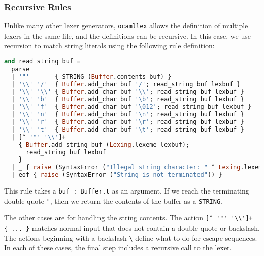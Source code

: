 \hypertarget{recursive-rules}{%
\subsubsection{Recursive Rules}\label{recursive-rules}}

Unlike many other lexer generators, \passthrough{\lstinline!ocamllex!}
allows the definition of multiple lexers in the same file, and the
definitions can be recursive. In this case, we use recursion to match
string literals using the following rule definition:

\begin{lstlisting}[language=Caml]
and read_string buf =
  parse
  | '"'       { STRING (Buffer.contents buf) }
  | '\\' '/'  { Buffer.add_char buf '/'; read_string buf lexbuf }
  | '\\' '\\' { Buffer.add_char buf '\\'; read_string buf lexbuf }
  | '\\' 'b'  { Buffer.add_char buf '\b'; read_string buf lexbuf }
  | '\\' 'f'  { Buffer.add_char buf '\012'; read_string buf lexbuf }
  | '\\' 'n'  { Buffer.add_char buf '\n'; read_string buf lexbuf }
  | '\\' 'r'  { Buffer.add_char buf '\r'; read_string buf lexbuf }
  | '\\' 't'  { Buffer.add_char buf '\t'; read_string buf lexbuf }
  | [^ '"' '\\']+
    { Buffer.add_string buf (Lexing.lexeme lexbuf);
      read_string buf lexbuf
    }
  | _ { raise (SyntaxError ("Illegal string character: " ^ Lexing.lexeme lexbuf)) }
  | eof { raise (SyntaxError ("String is not terminated")) }
\end{lstlisting}

This rule takes a \passthrough{\lstinline!buf : Buffer.t!} as an
argument. If we reach the terminating double quote
\passthrough{\lstinline!"!}, then we return the contents of the buffer
as a \passthrough{\lstinline!STRING!}.

The other cases are for handling the string contents. The action
\passthrough{\lstinline![^ '"' '\\\\']+ \{ ... \}!} matches normal input
that does not contain a double quote or backslash. The actions beginning
with a backslash \passthrough{\lstinline!\\!} define what to do for
escape sequences. In each of these cases, the final step includes a
recursive call to the lexer.

